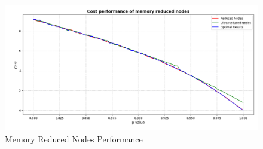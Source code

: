 \begin{figure}[htbp]
  \centering
  \includegraphics[width=\textwidth]{figs/Thomas/Return To Safety/0.8 to 1 Reduced Nodes.png}
  \caption{Memory Reduced Nodes Performance}
  \label{fig:Reduced Nodes}
\end{figure}